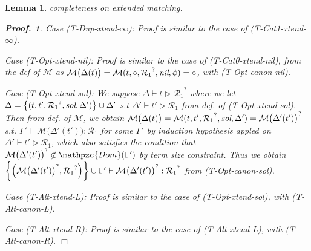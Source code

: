 \documentclass[12pt]{article}
\newtheorem{Lemma}{Lemma}[section]
\newtheorem{Proof}{Proof.}
\begin{document}
\begin{Lemma}{completeness on extended matching.}
\begin{Proof}
    Case (T-Dup-xtend-$\infty$):
    Proof is similar to the case of (T-Cat1-xtend-$\infty$).
    
    Case (T-Opt-xtend-nil):
    Proof is similar to the case of (T-Cat0-xtend-nil), from the def of
    $\mathcal{M}$ as
    $\mathcal{M}\bigl(\Delta(t) \bigr) =
    \mathcal{M}(t, \circ, {\mathcal{R}_1}^?, \text{\it nil}, \phi) =
    \circ$, with (T-Opt-canon-nil).

    Case (T-Opt-xtend-sol):
    We suppose
    $\Delta \vdash t \triangleright {\mathcal{R}_1}^?$ where we let
    $\Delta = \bigl\{(t, t', {\mathcal{R}_1}^?, \text{\it sol}, \Delta')
    \bigr\} \cup \Delta'$ s.t
    $\Delta' \vdash t' \triangleright \mathcal{R}_1$ from def. of
    (T-Opt-xtend-sol). Then from def. of $\mathcal{M}$, we obtain
    $\mathcal{M}\bigl(\Delta(t) \bigr) =
    \mathcal{M}(t, t', {\mathcal{R}_1}^?, \text{\it sol}, \Delta') =
    {\mathcal{M}\bigl(\Delta'(t') \bigr)}^?$ s.t.
    $\Gamma' \vdash \mathcal{M}\bigl(\Delta'(t') \bigr) : \mathcal{R}_1$
    for some $\Gamma'$ by induction hypothesis appled on
    $\Delta' \vdash t' \triangleright \mathcal{R}_1$, which also satisfies
    the condition that
    ${\mathcal{M}\bigl(\Delta'(t') \bigr)}^? \not\in \mathpzc{Dom}(
    \Gamma')$ by term size constraint. Thus we obtain
    $\biggl\{\Bigl({\mathcal{M}\bigl(\Delta'(t') \bigr)}^?,
    {\mathcal{R}_1}^? \Bigr) \biggr\} \cup \Gamma' \vdash
    {\mathcal{M}\bigl(\Delta'(t') \bigr)}^? : {\mathcal{R}_1}^?$ from
    (T-Opt-canon-sol).
    
    Case (T-Alt-xtend-L):
    Proof is similar to the case of (T-Opt-xtend-sol), with
    (T-Alt-canon-L).
    
    Case (T-Alt-xtend-R):
    Proof is similar to the case of (T-Alt-xtend-L), with (T-Alt-canon-R).
    $\Box$
  \end{Proof}
\end{Lemma}
\end{document}

